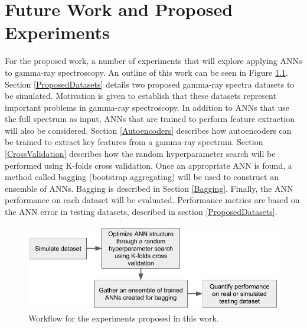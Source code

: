\documentclass[tocnosub,noragright,centerchapter,12pt,fullpage]{uiucecethesis09}
\begin{document}


\chapter{Future Work and Proposed Experiments}

For the proposed work, a number of experiments that will explore applying ANNs to gamma-ray spectroscopy. An outline of this work can be seen in Figure \ref{fig:ANN_workflow}. Section \ref{ProposedDatasets} details two proposed gamma-ray spectra datasets to be simulated. Motivation is given to establish that these datasets represent important problems in gamma-ray spectroscopy. In addition to ANNs that use the full spectrum as input, ANNs that are trained to perform feature extraction will also be considered. Section \ref{Autoencoders} describes how autoencoders can be trained to extract key features from a gamma-ray spectrum. Section \ref{CrossValidation} describes how the random hyperparameter search will be performed using K-folds cross validation. Once an appropriate ANN is found, a method called bagging (bootstrap aggregating) will be used to construct an ensemble of ANNs. Bagging is described in Section \ref{Bagging}. Finally, the ANN performance on each dataset will be evaluated. Performance metrics are based on the ANN error in testing datasets, described in section \ref{ProposedDatasets}.%




\begin{figure}[H]
\centering
\includegraphics[width=0.8\linewidth]{images/ANN_workflow}
\caption{Workflow for the experiments proposed in this work.}
\label{fig:ANN_workflow}
\end{figure}
\end{document}
